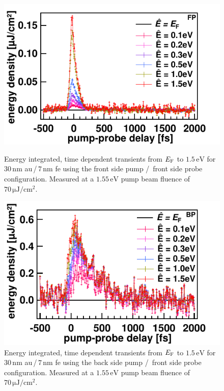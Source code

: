 \documentclass[a4paper,12pt,twoside]{article}
\begin{document}
\noindent
	\begin{figure}[H]
		\begin{minipage}[t]{.45\linewidth}
			\includegraphics[width=\linewidth]{figures/30nmFPcorr.pdf}
			\caption{Energy integrated, time dependent transients from $E_{\rm{F}}$ to $1.5\,\mathrm{{eV}}$ for $30\,\mathrm{{nm}}$ \gls{au}\,/\,$7\,\mathrm{{nm}}$ \gls{fe} using the front side pump /\, front side probe configuration. Measured at a $1.55\,\mathrm{eV}$ pump beam fluence of $70\,\mathrm{\mu J/cm^2}$.}
	    		\label{30nmFPnoNorm}
		\end{minipage}
	\hspace{.075\linewidth}
		\begin{minipage}[t]{.45\linewidth}
			\includegraphics[width=\linewidth]{figures/30nmBPcorr.pdf}
			\caption{Energy integrated, time dependent transients from $E_{\rm{F}}$ to $1.5\,\mathrm{{eV}}$ for $30\,\mathrm{{nm}}$ \gls{au}\,/\,$7\,\mathrm{{nm}}$ \gls{fe} using the back side pump /\, front side probe configuration. Measured at a $1.55\,\mathrm{eV}$ pump beam fluence of $70\,\mathrm{\mu J/cm^2}$.}
	    		\label{30nmBPnoNorm}
		\end{minipage}
	\end{figure}
\end{document}
